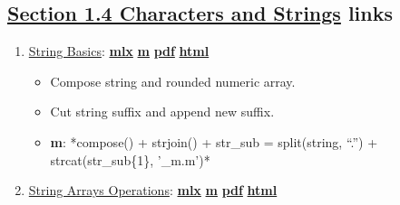 \documentclass[
]{book}
\providecommand{\tightlist}{%
  \setlength{\itemsep}{0pt}\setlength{\parskip}{0pt}}
\begin{document}
\hypertarget{section-1.4-characters-and-stringscharacters-and-strings-links}{%
\subsection{\texorpdfstring{\protect\hyperlink{characters-and-strings}{Section 1.4 Characters and Strings} links}{Section 1.4 Characters and Strings links}}\label{section-1.4-characters-and-stringscharacters-and-strings-links}}

\begin{enumerate}
\def\labelenumi{\arabic{enumi}.}
\tightlist
\item
  \href{https://fanwangecon.github.io/M4Econ/amto/string/htmlpdfm/fs_string.html}{String Basics}: \href{https://github.com/FanWangEcon/M4Econ/blob/master/amto/string/fs_string.mlx}{\textbf{mlx}} \textbar{} \href{https://github.com/FanWangEcon/M4Econ/blob/master/amto/string/htmlpdfm/fs_string.m}{\textbf{m}} \textbar{} \href{https://github.com/FanWangEcon/M4Econ/blob/master/amto/string/htmlpdfm/fs_string.pdf}{\textbf{pdf}} \textbar{} \href{https://fanwangecon.github.io/M4Econ/amto/string/htmlpdfm/fs_string.html}{\textbf{html}}

  \begin{itemize}
  \tightlist
  \item
    Compose string and rounded numeric array.
  \item
    Cut string suffix and append new suffix.
  \item
    \textbf{m}: *compose() + strjoin() + str\_sub = split(string, ``.'') + strcat(str\_sub\{1\}, '\_m.m')*
  \end{itemize}
\item
  \href{https://fanwangecon.github.io/M4Econ/amto/string/htmlpdfm/fs_string_array.html}{String Arrays Operations}: \href{https://github.com/FanWangEcon/M4Econ/blob/master/amto/string/fs_string_array.mlx}{\textbf{mlx}} \textbar{} \href{https://github.com/FanWangEcon/M4Econ/blob/master/amto/string/htmlpdfm/fs_string_array.m}{\textbf{m}} \textbar{} \href{https://github.com/FanWangEcon/M4Econ/blob/master/amto/string/htmlpdfm/fs_string_array.pdf}{\textbf{pdf}} \textbar{} \href{https://fanwangecon.github.io/M4Econ/amto/string/htmlpdfm/fs_string_array.html}{\textbf{html}}


\end{enumerate}
\end{document}

